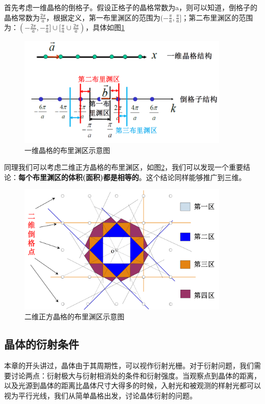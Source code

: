 \documentclass{ctexart}
\begin{document}
        首先考虑一维晶格的倒格子。假设正格子的晶格常数为a，则可以知道，倒格子的晶格常数为$\frac{2\pi}{a}$，根据定义，第一布里渊区的范围为$(-\frac{\pi}{a},\frac{\pi}{a}]$；第二布里渊区的范围为：$(-\frac{2\pi}{a},-\frac{\pi}{a}]\cup[\frac{\pi}{a}\cup\frac{2\pi}{a})$，具体如图\ref{fig:1DBrillouinzone}
        \begin{figure}[H]
            \centering
            \includegraphics[width=0.9\textwidth]{figure/一维布里渊区.png}
            \caption{一维晶格的布里渊区示意图}
            \label{fig:1DBrillouinzone}
        \end{figure}
        同理我们可以考虑二维正方晶格的布里渊区，如图\ref{fig:2DBrillouinzone}，我们可以发现一个重要结论：\textbf{每个布里渊区的体积(面积)都是相等的}。这个结论同样能够推广到三维。
        \begin{figure}[H]
            \centering
            \includegraphics[width=0.9\textwidth]{figure/二维布里渊区.png}
            \caption{二维正方晶格的布里渊区示意图}
            \label{fig:2DBrillouinzone}
        \end{figure}
        
        
        \subsection{晶体的衍射条件}
        本章的开头讲过，晶体由于其周期性，可以视作衍射光栅。对于衍射问题，我们需要讨论两点：衍射极大与衍射相消处的条件和衍射强度。当观察点到晶体的距离，以及光源到晶体的距离比晶体尺寸大得多的时候，入射光和被观测的样射光都可以视为平行光线，我们从简单晶格出发，讨论晶体衍射的问题。
        
\end{document}
